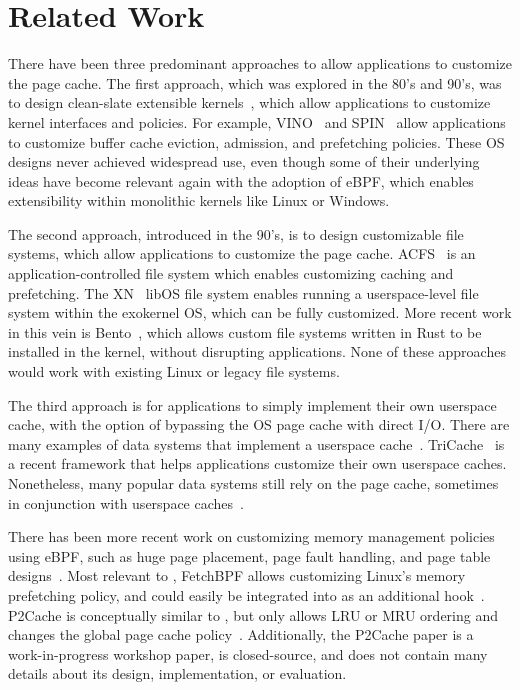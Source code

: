 \section{Related Work}
\label{sec:related}






There have been three predominant approaches to allow applications to customize the page cache. 
The first approach, which was explored in the 80's and 90's, was to design clean-slate extensible kernels~\cite{SPIN,VINO,exokernel-original,mach}, which allow applications to customize kernel interfaces and policies. For example, VINO~\cite{VINO,VINO-2} and SPIN~\cite{SPIN} %
allow applications to customize buffer cache eviction, admission, and prefetching policies. These OS designs never achieved widespread use, even though some of their underlying ideas have become relevant again with the adoption of eBPF, which enables extensibility within monolithic kernels like Linux or Windows.

The second approach, introduced in the 90's, is to design customizable file systems, which allow applications to customize the page cache. ACFS~\cite{kai-li-caching,kai-li-caching2} is an application-controlled file system which enables customizing caching and prefetching. The XN~\cite{exokernel} libOS file system enables running a userspace-level file system within the exokernel OS, which can be fully customized. More recent work in this vein is Bento~\cite{bento}, which allows custom file systems written in Rust to be installed in the kernel, without disrupting applications. None of these approaches would work with existing Linux or legacy file systems. %

The third approach is for applications to simply implement their own userspace cache, with the option of bypassing the OS page cache with direct I/O. There are many examples of data systems that implement a userspace cache~\cite{rocksdb,wisckey,splinterdb}. TriCache~\cite{tricache} is a recent framework that helps applications customize their own userspace caches. Nonetheless, many popular data systems still rely on the page cache, sometimes in conjunction with userspace caches~\cite{rocksdb,postgres,wiredtiger,symbiosis,combining-caches}. %

There has been more recent work on customizing memory management policies using eBPF, such as huge page placement, page fault handling, and page table designs~\cite{prog-mem-bpf,custom-page-fault,ebpf-mm}. Most relevant to \name, FetchBPF allows customizing Linux's memory prefetching policy, and could easily be integrated into \name as an additional hook~\cite{fetchbpf}. P2Cache is conceptually similar to \name, but only allows LRU or MRU ordering and changes the global page cache policy~\cite{P2Cache}. Additionally, the P2Cache paper is a work-in-progress workshop paper, is closed-source, and does not contain many details about its design, implementation, or evaluation.


